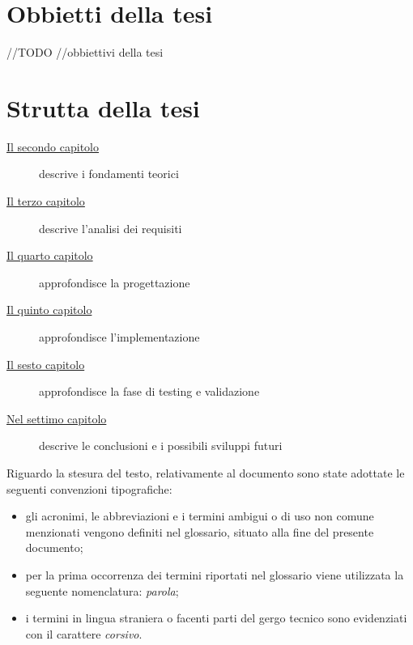 \section{Obbietti della tesi}
//TODO
//obbiettivi della tesi\\


\section{Strutta della tesi}

\begin{description}
    \item[{\hyperref[cap:processi-metodologie]{Il secondo capitolo}}] descrive i fondamenti teorici
    
    \item[{\hyperref[cap:descrizione-stage]{Il terzo capitolo}}] descrive l'analisi dei requisiti
    
    \item[{\hyperref[cap:analisi-requisiti]{Il quarto capitolo}}] approfondisce la progettazione
    
    \item[{\hyperref[cap:progettazione-codifica]{Il quinto capitolo}}] approfondisce l'implementazione
    
    \item[{\hyperref[cap:verifica-validazione]{Il sesto capitolo}}] approfondisce la fase di testing e validazione
    
    \item[{\hyperref[cap:conclusioni]{Nel settimo capitolo}}] descrive le conclusioni e i possibili sviluppi futuri
\end{description}

Riguardo la stesura del testo, relativamente al documento sono state adottate le seguenti convenzioni tipografiche:
\begin{itemize}
	\item gli acronimi, le abbreviazioni e i termini ambigui o di uso non comune menzionati vengono definiti nel glossario, situato alla fine del presente documento;
	\item per la prima occorrenza dei termini riportati nel glossario viene utilizzata la seguente nomenclatura: \emph{parola}\glsfirstoccur;
	\item i termini in lingua straniera o facenti parti del gergo tecnico sono evidenziati con il carattere \emph{corsivo}.
\end{itemize}
